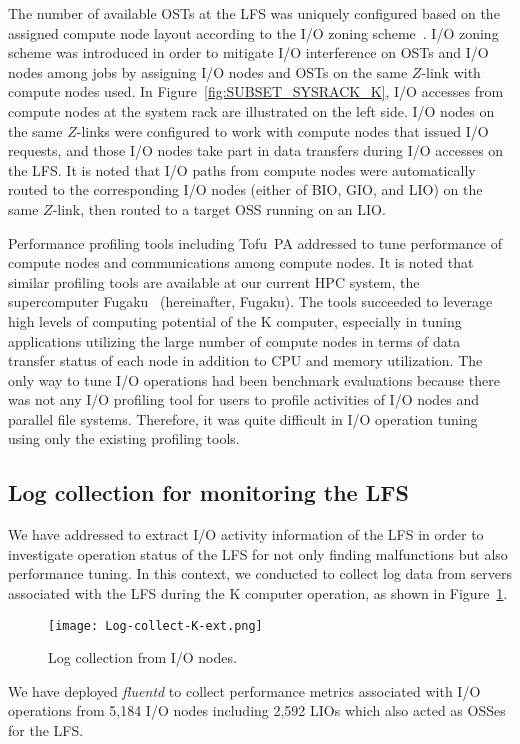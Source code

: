 \documentclass{jhps}
\begin{document}
The number of available OSTs at the LFS was uniquely configured
based on the assigned compute node layout according to
the I/O zoning scheme~\cite{sumimoto:LUG2011}.
I/O zoning scheme was introduced in order to mitigate I/O interference on OSTs
and I/O nodes among jobs by assigning I/O nodes and OSTs on the same $Z$-link
with compute nodes used.
In Figure~\ref{fig:SUBSET_SYSRACK_K}, I/O accesses from compute nodes
at the system rack are illustrated on the left side.
I/O nodes on the same $Z$-links were configured to work with compute nodes
that issued I/O requests, and those I/O nodes
take part in data transfers during I/O accesses on the LFS.
It is noted that I/O paths from compute nodes were automatically routed
to the corresponding I/O nodes (either of BIO, GIO, and LIO) on the same $Z$-link,
then routed to a target OSS running on an LIO.

Performance profiling tools including Tofu~PA addressed to tune performance of
compute nodes and communications among compute nodes.
It is noted that similar profiling tools are available at
our current HPC system, the supercomputer Fugaku~\cite{fugaku_info:web}
(hereinafter, Fugaku).
The tools succeeded to leverage high levels of computing potential of the K computer,
especially in tuning applications utilizing the large number of compute nodes
in terms of data transfer status of each node in addition to CPU and memory utilization.
The only way to tune I/O operations had been benchmark evaluations
because there was not any I/O profiling tool for users to profile activities
of I/O nodes and parallel file systems.
Therefore, it was quite difficult in I/O operation tuning
using only the existing profiling tools.

\subsection{Log collection for monitoring the LFS}
\label{ssec:LOG_COLL_MON}

We have addressed to extract I/O activity information of the LFS
in order to investigate operation status of the LFS
for not only finding malfunctions but also performance tuning.
In this context, we conducted to collect log data from servers
associated with the LFS during the K computer operation,
as shown in Figure~\ref{fig:Log-collect-K}.
%
\begin{figure}[tb]
\centering
\texttt{[image: Log-collect-K-ext.png]}
\caption{Log collection from I/O nodes.}
\label{fig:Log-collect-K}
\end{figure}
We have deployed {\itshape fluentd} to collect performance metrics associated with
I/O operations from 5,184 I/O nodes including 2,592 LIOs which also acted as OSSes
for the LFS.
\end{document}
